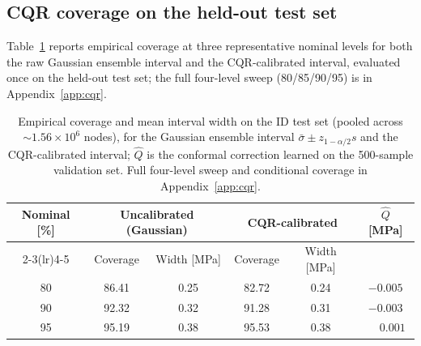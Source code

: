 \documentclass{article}
\begin{document}
\subsection{CQR coverage on the held-out test set}
\label{ssec:results-cqr}

Table~\ref{tab:coverage} reports empirical coverage at three
representative nominal levels for both the raw Gaussian ensemble
interval and the CQR-calibrated interval, evaluated once on the
held-out test set; the full four-level sweep
(80/85/90/95) is in Appendix~\ref{app:cqr}.

\begin{table}[t]
  \centering
  \caption{Empirical coverage and mean interval width on the ID test set
    (pooled across $\sim 1.56\times 10^{6}$ nodes), for the Gaussian
    ensemble interval $\bar{\sigma} \pm z_{1-\alpha/2}s$ and the
    CQR-calibrated interval; $\hat{Q}$ is the conformal correction
    learned on the 500-sample validation set. Full four-level sweep and
    conditional coverage in Appendix~\ref{app:cqr}.}
  \label{tab:coverage}
  \begin{tabular}{cccccc}
    \toprule
    Nominal [\%] &
    \multicolumn{2}{c}{Uncalibrated (Gaussian)} &
    \multicolumn{2}{c}{CQR-calibrated} &
    $\hat{Q}$ [MPa] \\
    \cmidrule(lr){2-3}\cmidrule(lr){4-5}
    & Coverage & Width [MPa] & Coverage & Width [MPa] & \\
    \midrule
    80 & 86.41 & 0.25 & 82.72 & 0.24 & $-0.005$ \\
    90 & 92.32 & 0.32 & 91.28 & 0.31 & $-0.003$ \\
    95 & 95.19 & 0.38 & 95.53 & 0.38 & $\phantom{-}0.001$ \\
    \bottomrule
  \end{tabular}
\end{table}
\end{document}

